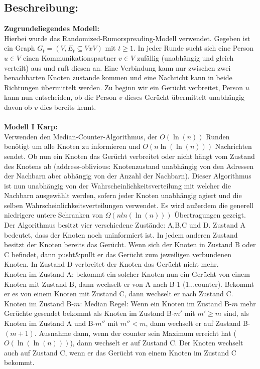 \documentclass[12pt,a4paper]{report}
\begin{document}
\subsection*{Beschreibung:}
\textbf{Zugrundeliegendes Modell:}\\
 Hierbei wurde das Randomized-Rumorspreading-Modell verwendet. Gegeben ist ein Graph $G_t=(V,E_t \subseteq VxV)$ mit $t \ge 1$. In jeder Runde sucht sich eine Person $u \in V$ einen Kommunikationspartner $v \in V$ zufällig (unabhängig und gleich verteilt) aus und ruft diesen an. Eine Verbindung kann nur zwischen zwei benachbarten Knoten zustande kommen und eine Nachricht kann in beide Richtungen übermittelt werden. Zu beginn wir ein Gerücht verbreitet, Person $u$ kann nun entscheiden, ob die Person $v$ dieses Gerücht übermittelt unabhängig davon ob $v$ dies bereits kennt.\\
\\
\textbf{Modell I Karp:}\\
Verwenden den Median-Counter-Algorithmus, der $O(\ln(n))$ Runden benötigt um alle Knoten zu informieren und $O(n\ln(\ln(n)))$ Nachrichten sendet. Ob nun ein Knoten das Gerücht verbreitet oder nicht hängt vom Zustand des Knotens ab (address-oblivious: Knotenzustand unabhängig von den Adressen der Nachbarn aber abhängig von der Anzahl der Nachbarn). Dieser Algorithmus ist nun unabhängig von der Wahrscheinlichkeitsverteilung mit welcher die Nachbarn ausgewählt werden, sofern jeder Knoten unabhängig agiert und die selben Wahrscheinlichkeitsverteilungen verwendet. Es wird außerdem die generell niedrigere untere Schranken von $\Omega (n ln(\ln(n)))$ Übertragungen gezeigt. Der Algorithmus besitzt vier verschiedene Zustände: A,B,C und D. Zustand A bedeutet, dass der Knoten noch uninformiert ist. In jedem anderen Zustand besitzt der Knoten bereits das Gerücht. Wenn sich der Knoten in Zustand B oder C befindet, dann pusht\&pullt er das Gerücht zum jeweiligen verbundenen Knoten. In Zustand D verbreitet der Knoten das Gerücht nicht mehr. \\
Knoten im Zustand A:
bekommt ein solcher Knoten nun ein Gerücht von einem Knoten mit Zustand B, dann wechselt er von A nach B-1 (1...counter). Bekommt er es von einem Knoten mit Zustand C, dann wechselt er nach Zustand C.\\
Knoten im Zustand B-$m$: Median Regel: Wenn ein Knoten im Zustand B-$m$ mehr Gerüchte gesendet bekommt als Knoten im Zustand B-$m'$ mit $m' \ge m$ sind, als Knoten im Zustand A und B-$m''$ mit $m'' < m$, dann wechselt er auf Zustand B-$(m+1)$. Ausnahme dann, wenn der counter sein Maximum erreicht hat ($O(\ln(\ln(n)))$), dann wechselt er auf Zustand C. Der Knoten wechselt auch auf Zustand C, wenn er das Gerücht von einem Knoten im Zustand C bekommt.\\
\end{document}
